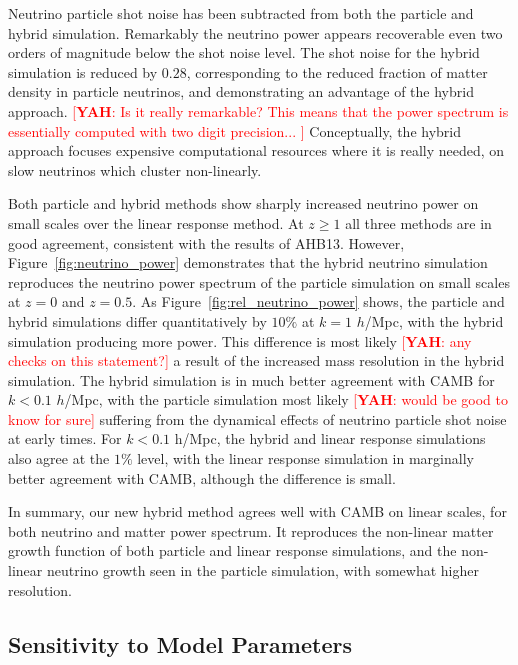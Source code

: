 \documentclass[useAMS, usenatbib]{mnras}
\newcommand{\yah}[1]{{\textcolor{red}{[{\bf YAH}: #1]}}}
\begin{document}
Neutrino particle shot noise has been subtracted from both the particle and hybrid simulation. Remarkably the neutrino power appears recoverable even two orders of magnitude below the shot noise level. The shot noise for the hybrid simulation is reduced by $0.28$, corresponding to the reduced fraction of matter density in particle neutrinos, and demonstrating an advantage of the hybrid approach. \yah{Is it really remarkable? This means that the power spectrum is essentially computed with two digit precision... } Conceptually, the hybrid approach focuses expensive computational resources where it is really needed, on slow neutrinos which cluster non-linearly.

Both particle and hybrid methods show sharply increased neutrino power on small scales over the linear response method. At $z \geq 1$ all three methods are in good agreement, consistent with the results of AHB13. However, Figure~\ref{fig:neutrino_power} demonstrates that the hybrid neutrino simulation reproduces the neutrino power spectrum of the particle simulation on small scales at $z = 0$ and $z=0.5$. As Figure~\ref{fig:rel_neutrino_power} shows, the particle and hybrid simulations differ quantitatively by $10\%$ at $k=1$ $h$/Mpc, with the hybrid simulation producing more power. This difference is most likely \yah{any checks on this statement?} a result of the increased mass resolution in the hybrid simulation. The hybrid simulation is in much better agreement with CAMB for $k < 0.1$ $h$/Mpc, with the particle simulation most likely \yah{would be good to know for sure} suffering from the dynamical effects of neutrino particle shot noise at early times. For $k < 0.1$ h/Mpc, the hybrid and linear response simulations also agree at the $1\%$ level, with the linear response simulation in marginally better agreement with CAMB, although the difference is small. 

In summary, our new hybrid method agrees well with CAMB on linear scales, for both neutrino and matter power spectrum. It reproduces the non-linear matter growth function of both particle and linear response simulations, and the non-linear neutrino growth seen in the particle simulation, with somewhat higher resolution.

\subsection{Sensitivity to Model Parameters}
\label{sec:check}
\end{document}
